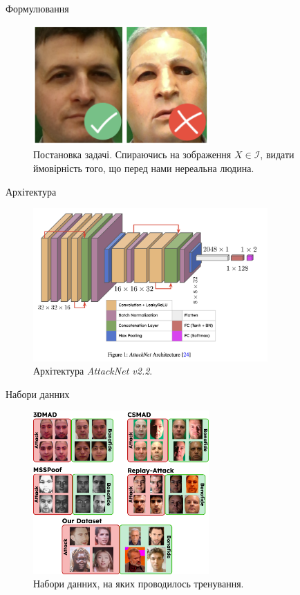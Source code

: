 \documentclass[xcolor={usenames,dvipsnames}]{beamer}
\begin{document}
    \begin{frame}{Формулювання}
        \begin{figure}
        \centering
            \includegraphics[width=0.6\textwidth]{images/statement.png}
            \caption{Постановка задачі. Спираючись на зображення $X \in \mathcal{I}$, видати ймовірність того, що перед нами нереальна людина.}
        \end{figure}
    \end{frame}

    \begin{frame}{Архітектура}
        \begin{figure}
        \centering
            \includegraphics[width=0.8\textwidth]{images/attacknet.png}
            \caption{Архітектура \textit{AttackNet v2.2}.}
        \end{figure}
    \end{frame}

    \begin{frame}{Набори данних}
        \begin{figure}
        \centering
            \includegraphics[width=0.6\textwidth]{images/anti_datasets.png}
            \caption{Набори данних, на яких проводилось тренування.}
        \end{figure}
    \end{frame}
\end{document}

